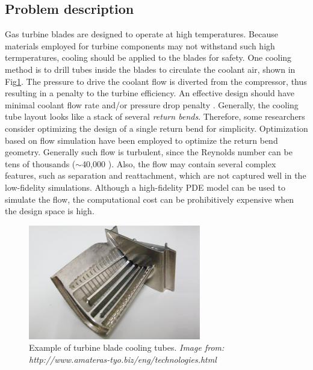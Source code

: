 \documentclass[a4paper,onecolumn]{article}
\theoremstyle{remark}
\begin{document}
\subsection{Problem description}
\noindent Gas turbine blades are designed to operate at high temperatures. Because 
materials employed for turbine components may not withstand such high termperatures,
cooling should be applied to the blades for safety. One cooling method is
to drill tubes inside the blades to circulate the coolant air, shown in Fig\ref{fig: ubend picture}.
The pressure to drive the coolant flow is diverted from the compressor, thus resulting
in a penalty to the turbine efficiency.
An effective design should have minimal coolant flow rate and/or pressure drop penalty 
\cite{ubend rans opt 1, ubend rans opt 2}.
Generally, the cooling tube layout looks like a stack of several \emph{return bends}.
Therefore, some researchers consider optimizing the design of a single return bend
for simplicity. Optimization based on flow simulation have been employed to optimize
the return bend geometry. Generally such flow is turbulent, since the Reynolds number 
can be tens of thousands ($\sim$40,000 \cite{ubend rans opt 2}). 
Also, the flow may contain several complex
features, such as separation and reattachment, which are not captured well in the low-fidelity
simulations. Although a high-fidelity PDE model can be used to simulate the flow, 
the computational cost can be prohibitively expensive when the design space is high. 
\begin{figure}[H]\begin{center}
    \includegraphics[height=5cm]{ubend.png}
    \caption{Example of turbine blade cooling tubes.
    \emph{Image from: http://www.amateras-tyo.biz/eng/technologies.html}}
    \label{fig: ubend picture}
\end{center}\end{figure}
\end{document}
